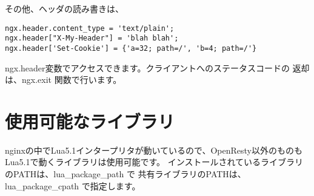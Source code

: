 その他、ヘッダの読み書きは、
\begin{lstlisting}[caption=ヘッダの読み書き,label=list:hello-world]
ngx.header.content_type = 'text/plain';
ngx.header["X-My-Header"] = 'blah blah';
ngx.header['Set-Cookie'] = {'a=32; path=/', 'b=4; path=/'}
\end{lstlisting}
%
ngx.header変数でアクセスできます。クライアントへのステータスコードの
返却は、ngx.exit 関数で行います。

\section*{使用可能なライブラリ}
nginxの中でLua5.1インタープリタが動いているので、OpenResty以外のものも
Lua5.1で動くライブラリは使用可能です。
インストールされているライブラリのPATHは、lua\_package\_path で
共有ライブラリのPATHは、lua\_package\_cpath で指定します。

